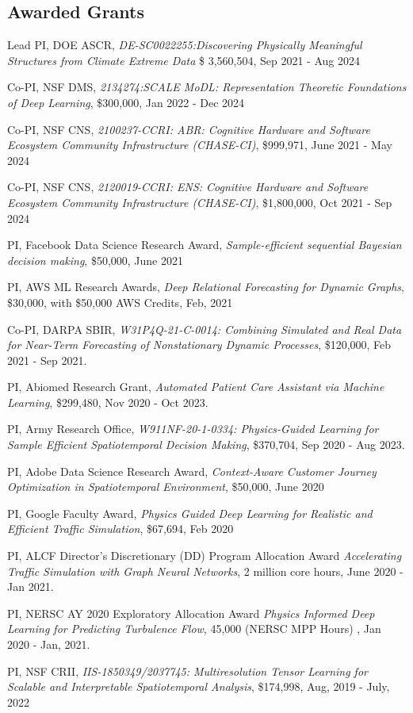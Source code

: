 \documentclass[margin,line]{res}
\begin{document}
\begin{resume}
\section{\sc Awarded Grants}
\begin{enumerate}[label={[G\arabic*]}]
\item Lead PI,  DOE ASCR, \textit{DE-SC0022255:Discovering Physically Meaningful Structures from Climate
Extreme Data} \$ 3,560,504, Sep 2021 - Aug 2024
\item Co-PI, NSF DMS, \textit{2134274:SCALE MoDL: Representation Theoretic Foundations of Deep Learning}, \$300,000, Jan 2022 - Dec 2024

 \item Co-PI, NSF CNS, \textit{ 2100237-CCRI: ABR: Cognitive Hardware and Software Ecosystem Community Infrastructure (CHASE-CI)}, \$999,971,  June 2021 - May 2024
\item Co-PI, NSF CNS, \textit{2120019-CCRI: ENS: Cognitive Hardware and Software Ecosystem Community Infrastructure (CHASE-CI)}, \$1,800,000,  Oct 2021 - Sep 2024
\item PI, Facebook  Data Science  Research Award, \textit{Sample-efficient sequential Bayesian decision making}, \$50,000, June 2021
\item PI, AWS ML Research Awards, \textit{Deep Relational Forecasting for Dynamic Graphs}, \$30,000, with \$50,000 AWS Credits, Feb, 2021
\item Co-PI, DARPA SBIR, \textit{W31P4Q-21-C-0014: Combining Simulated and Real Data for Near-Term Forecasting of Nonstationary Dynamic Processes}, \$120,000, Feb 2021 - Sep 2021.
\item PI, {Abiomed Research Grant}, \textit{Automated Patient Care Assistant via Machine Learning}, \$299,480, Nov 2020 - Oct 2023.
\item PI,   Army Research Office,  \textit{W911NF-20-1-0334: Physics-Guided Learning for Sample Efficient Spatiotemporal Decision Making}, \$370,704, Sep 2020 - Aug 2023. 
\item PI, Adobe Data Science Research Award, \textit{Context-Aware Customer Journey Optimization in Spatiotemporal Environment}, \$50,000, June 2020
\item PI, Google Faculty Award,  \textit{Physics Guided Deep Learning for Realistic and Efficient Traffic Simulation}, \$67,694, Feb 2020
\item PI,  ALCF Director’s Discretionary (DD) Program Allocation Award \textit{Accelerating Traffic Simulation with Graph Neural Networks},  2 million core hours, June 2020 - Jan 2021.
\item PI,  NERSC AY 2020 Exploratory Allocation Award \textit{Physics Informed Deep Learning for Predicting Turbulence Flow}, 45,000  (NERSC MPP Hours) , Jan 2020 - Jan, 2021.
\item  PI, {NSF CRII},    \textit{IIS-1850349/2037745: Multiresolution Tensor Learning for Scalable and Interpretable Spatiotemporal Analysis},    \$174,998,  Aug, 2019 - July, 2022


\end{enumerate}
\end{resume}
\end{document}
